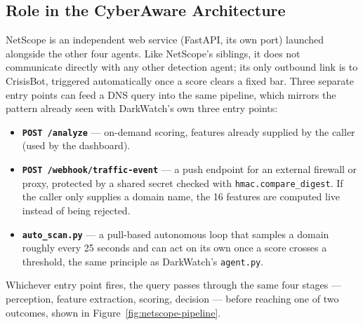 \documentclass[12pt,a4paper]{report}
\newcommand{\ProjectName}{CyberAware}
\begin{document}
\subsection*{Role in the \ProjectName{} Architecture}
NetScope is an independent web service (FastAPI, its own port) launched alongside the other four agents. Like NetScope's siblings, it does not communicate directly with any other detection agent; its only outbound link is to CrisisBot, triggered automatically once a score clears a fixed bar. Three separate entry points can feed a DNS query into the same pipeline, which mirrors the pattern already seen with DarkWatch's own three entry points:

\begin{itemize}[nosep]
\item \textbf{\texttt{POST /analyze}} --- on-demand scoring, features already supplied by the caller (used by the dashboard).
\item \textbf{\texttt{POST /webhook/traffic-event}} --- a push endpoint for an external firewall or proxy, protected by a shared secret checked with \texttt{hmac.compare\_digest}. If the caller only supplies a domain name, the 16 features are computed live instead of being rejected.
\item \textbf{\texttt{auto\_scan.py}} --- a pull-based autonomous loop that samples a domain roughly every 25 seconds and can act on its own once a score crosses a threshold, the same principle as DarkWatch's \texttt{agent.py}.
\end{itemize}

Whichever entry point fires, the query passes through the same four stages --- perception, feature extraction, scoring, decision --- before reaching one of two outcomes, shown in Figure~\ref{fig:netscope-pipeline}.
\end{document}
